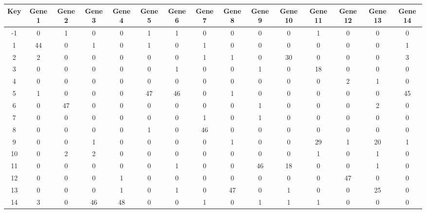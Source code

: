 \begin{tabular}{|c|c|c|c|c|c|c|c|c|c|c|c|c|c|c|}
\hline
Key & Gene 1 & Gene 2 & Gene 3 & Gene 4 & Gene 5 & Gene 6 & Gene 7 & Gene 8 & Gene 9 & Gene 10 & Gene 11 & Gene 12 & Gene 13 & Gene 14 \\
\hline
-1 & 0 & 1 & 0 & 0 & 1 & 1 & 0 & 0 & 0 & 0 & 1 & 0 & 0 & 0 \\
1 & 44 & 0 & 1 & 0 & 1 & 0 & 1 & 0 & 0 & 0 & 0 & 0 & 0 & 1 \\
2 & 2 & 0 & 0 & 0 & 0 & 0 & 1 & 1 & 0 & 30 & 0 & 0 & 0 & 3 \\
3 & 0 & 0 & 0 & 0 & 0 & 1 & 0 & 0 & 1 & 0 & 18 & 0 & 0 & 0 \\
4 & 0 & 0 & 0 & 0 & 0 & 0 & 0 & 0 & 0 & 0 & 0 & 2 & 1 & 0 \\
5 & 1 & 0 & 0 & 0 & 47 & 46 & 0 & 1 & 0 & 0 & 0 & 0 & 0 & 45 \\
6 & 0 & 47 & 0 & 0 & 0 & 0 & 0 & 0 & 1 & 0 & 0 & 0 & 2 & 0 \\
7 & 0 & 0 & 0 & 0 & 0 & 0 & 1 & 0 & 1 & 0 & 0 & 0 & 0 & 0 \\
8 & 0 & 0 & 0 & 0 & 1 & 0 & 46 & 0 & 0 & 0 & 0 & 0 & 0 & 0 \\
9 & 0 & 0 & 1 & 0 & 0 & 0 & 0 & 1 & 0 & 0 & 29 & 1 & 20 & 1 \\
10 & 0 & 2 & 2 & 0 & 0 & 0 & 0 & 0 & 0 & 0 & 1 & 0 & 1 & 0 \\
11 & 0 & 0 & 0 & 0 & 0 & 1 & 0 & 0 & 46 & 18 & 0 & 0 & 1 & 0 \\
12 & 0 & 0 & 0 & 1 & 0 & 0 & 0 & 0 & 0 & 0 & 0 & 47 & 0 & 0 \\
13 & 0 & 0 & 0 & 1 & 0 & 1 & 0 & 47 & 0 & 1 & 0 & 0 & 25 & 0 \\
14 & 3 & 0 & 46 & 48 & 0 & 0 & 1 & 0 & 1 & 1 & 1 & 0 & 0 & 0 \\
\hline
\end{tabular}